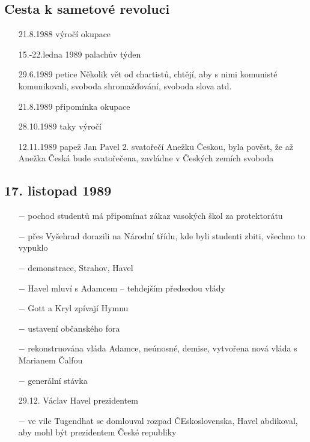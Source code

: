 \documentclass{article}
\begin{document}
\subsection*{Cesta k sametové revoluci}
\begin{itemize}
    \vspace{-0.5em}
    \setlength\itemsep{0.15em}
    \item[21.8.1988] výročí okupace
    \item[15.-22.ledna 1989] palachův týden
    \item[29.6.1989] petice Několik vět od chartistů, chtějí, aby s nimi komunisté komunikovali, svoboda shromažďování, svoboda slova atd.
    \item[21.8.1989] připomínka okupace
    \item[28.10.1989] taky výročí
    \item[12.11.1989] papež Jan Pavel 2. svatořečí Anežku Českou, byla pověst, že až Anežka Česká bude svatořečena, zavládne v Českých zemích svoboda
\end{itemize}

\subsection*{17. listopad 1989}
\begin{itemize}
    \vspace{-0.5em}
    \setlength\itemsep{0.15em}
    \item[$-$] pochod studentů má připomínat zákaz vasokých škol za protektorátu
    \item[$-$] přes Vyšehrad dorazili na Národní třídu, kde byli studenti zbiti, všechno to vypuklo
    \item[$-$] demonstrace, Strahov, Havel
    \item[$-$] Havel mluví s Adamcem -- tehdejším předsedou vlády
    \item[$-$] Gott a Kryl zpívají Hymnu
    \item[$-$]  ustavení občanského fora
    \item[$-$] rekonstruována vláda Adamce, neúnosné, demise, vytvořena nová vláda s Marianem Čalfou
    \item[$-$] generální stávka
    \item[29.12.] Václav Havel prezidentem
    \item[$-$] ve vile Tugendhat se domlouval rozpad ČEskoslovenska, Havel abdikoval, aby mohl být prezidentem České republiky  
\end{itemize}
\end{document}

